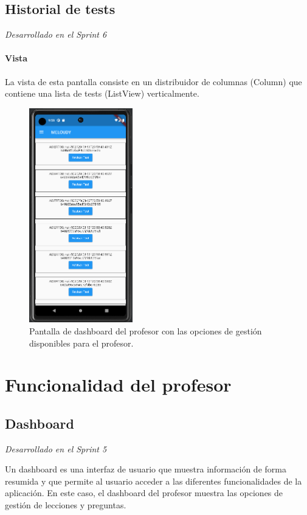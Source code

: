 \subsection{Historial de tests}
\textit{Desarrollado en el Sprint 6}
\label{sec:historial}

\paragraph*{Vista}
\label{sec:vista}
La vista de esta pantalla consiste en un distribuidor de columnas (Column) que contiene una lista de tests (ListView) verticalmente. 

\begin{figure}[H]
  \centering
  \includegraphics[width=0.4\textwidth]{imagenes/c7/historialtest.png}
  \caption{Pantalla de dashboard del profesor con las opciones de gestión disponibles para el profesor.}
  \label{fig:login}
\end{figure}


\section{Funcionalidad del profesor}

\subsection{Dashboard}
\textit{Desarrollado en el Sprint 5}
\label{sec:dashboard}

Un dashboard es una interfaz de usuario que muestra información de forma resumida y que permite al usuario acceder a las diferentes funcionalidades de la aplicación. En este caso, el dashboard del profesor muestra las opciones de gestión de lecciones y preguntas.

